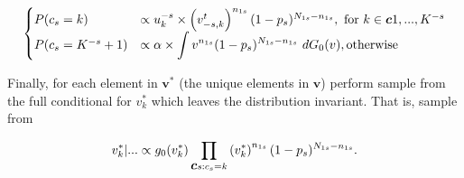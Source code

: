 \documentclass[12pt]{article}
\newcommand{\bc}{\mbox{\boldmath $c$}}
\begin{document}
$$
\begin{cases}
  P(c_s = k) & \propto u^{-s}_k \times \p{v_{-s,k}^{t}}^{n_{1s}} (1-p_s)^{N_{1s}-n_{1s}}, \text{ for } k \in \bc{1,...,K^{-s}}\\
  P(c_s = K^{-s}+1) & \propto \alpha \times \ds\int v^{n_{1s}} (1-p_s)^{N_{1s}-n_{1s}} ~dG_0(v), \text{otherwise}
\end{cases}
$$

\noindent
Finally, for each element in $\bm v^*$ (the unique elements in $\bm v$) perform sample from the full conditional for $v_k^*$
which leaves the distribution invariant. That is, sample from

$$
v_k^* | ... \propto g_0(v_k^*) \prod_{\bc{s:c_s=k}} \p{v_k^*}^{n_{1s}}(1-p_s)^{N_{1s}-n_{1s}}.
$$


\end{document}
